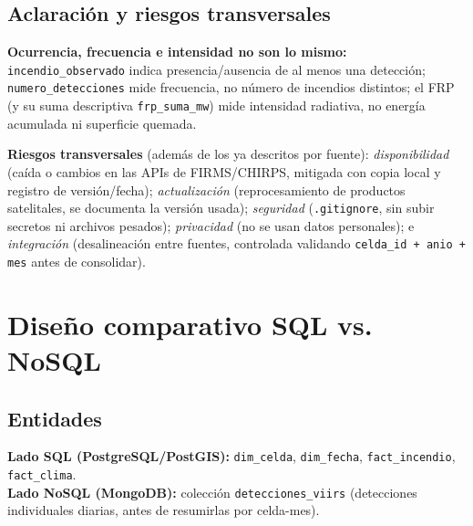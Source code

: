 \documentclass[11pt,a4paper]{article}
\begin{document}
\subsection*{Aclaraci\'on y riesgos transversales}
\footnotesize
\textbf{Ocurrencia, frecuencia e intensidad no son lo mismo:} \texttt{incendio\_observado} indica presencia/ausencia de al menos una detecci\'on; \texttt{numero\_detecciones} mide frecuencia, no n\'umero de incendios distintos; el FRP (y su suma descriptiva \texttt{frp\_suma\_mw}) mide intensidad radiativa, no energ\'ia acumulada ni superficie quemada.

\textbf{Riesgos transversales} (adem\'as de los ya descritos por fuente): \emph{disponibilidad} (ca\'ida o cambios en las APIs de FIRMS/CHIRPS, mitigada con copia local y registro de versi\'on/fecha); \emph{actualizaci\'on} (reprocesamiento de productos satelitales, se documenta la versi\'on usada); \emph{seguridad} (\texttt{.gitignore}, sin subir secretos ni archivos pesados); \emph{privacidad} (no se usan datos personales); e \emph{integraci\'on} (desalineaci\'on entre fuentes, controlada validando \texttt{celda\_id + anio + mes} antes de consolidar).
\normalsize

\section{Dise\~no comparativo SQL vs. NoSQL}

\subsection{Entidades}
\textbf{Lado SQL (PostgreSQL/PostGIS):} \texttt{dim\_celda}, \texttt{dim\_fecha}, \texttt{fact\_incendio}, \texttt{fact\_clima}.\\
\textbf{Lado NoSQL (MongoDB):} colecci\'on \texttt{detecciones\_viirs} (detecciones individuales diarias, antes de resumirlas por celda-mes).
\end{document}

